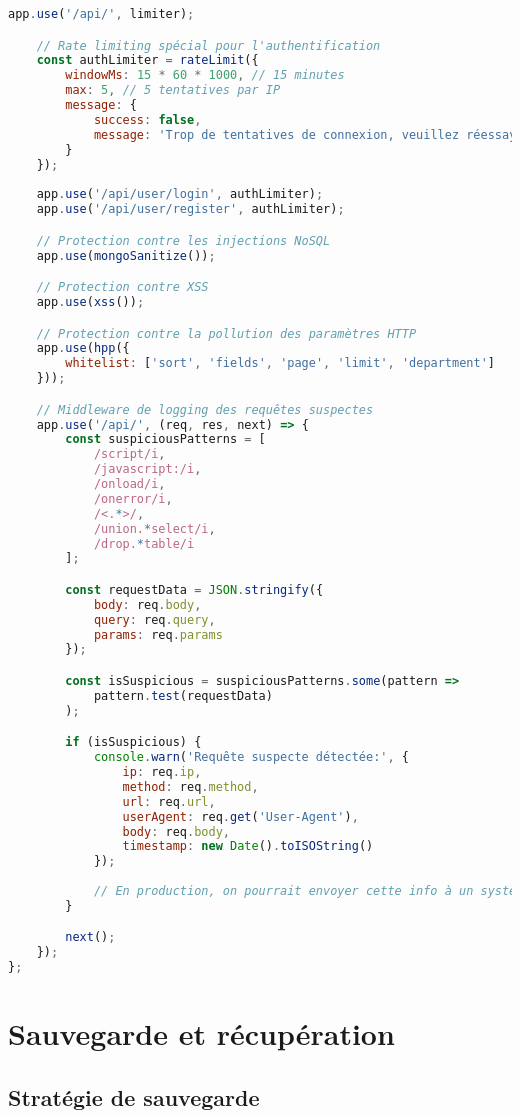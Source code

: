 \begin{lstlisting}[language=JavaScript, caption=security-middleware.js]
    app.use('/api/', limiter);

    // Rate limiting spécial pour l'authentification
    const authLimiter = rateLimit({
        windowMs: 15 * 60 * 1000, // 15 minutes
        max: 5, // 5 tentatives par IP
        message: {
            success: false,
            message: 'Trop de tentatives de connexion, veuillez réessayer dans 15 minutes.'
        }
    });
    
    app.use('/api/user/login', authLimiter);
    app.use('/api/user/register', authLimiter);

    // Protection contre les injections NoSQL
    app.use(mongoSanitize());

    // Protection contre XSS
    app.use(xss());

    // Protection contre la pollution des paramètres HTTP
    app.use(hpp({
        whitelist: ['sort', 'fields', 'page', 'limit', 'department']
    }));

    // Middleware de logging des requêtes suspectes
    app.use('/api/', (req, res, next) => {
        const suspiciousPatterns = [
            /script/i,
            /javascript:/i,
            /onload/i,
            /onerror/i,
            /<.*>/,
            /union.*select/i,
            /drop.*table/i
        ];

        const requestData = JSON.stringify({
            body: req.body,
            query: req.query,
            params: req.params
        });

        const isSuspicious = suspiciousPatterns.some(pattern => 
            pattern.test(requestData)
        );

        if (isSuspicious) {
            console.warn('Requête suspecte détectée:', {
                ip: req.ip,
                method: req.method,
                url: req.url,
                userAgent: req.get('User-Agent'),
                body: req.body,
                timestamp: new Date().toISOString()
            });
            
            // En production, on pourrait envoyer cette info à un système de monitoring
        }

        next();
    });
};
\end{lstlisting}

\section{Sauvegarde et récupération}

\subsection{Stratégie de sauvegarde}

